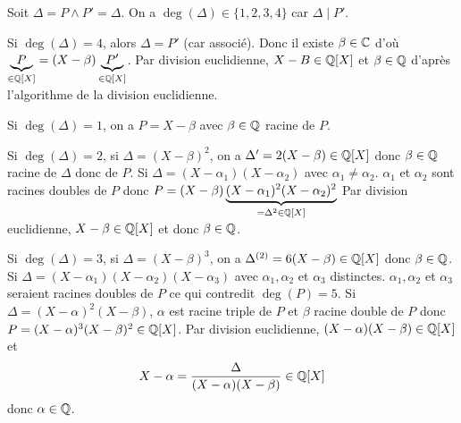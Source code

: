 \begin{solution}
	Soit $\Delta=P\wedge P'=\Delta$. On a $\deg(\Delta)\in\{1,2,3,4\}$ car $\Delta\mid P'$.

	Si $\deg(\Delta)=4$, alors $\Delta=P'$ (car associé). Donc il existe $\beta\in\mathbb{C}$ d'où $\underbrace{P}_{\in\mathbb{Q}[X]}=(X-\beta)\underbrace{P'}_{\in\mathbb{Q}[X]}$. Par division euclidienne, $X-B\in\mathbb{Q}[X]$ et $\beta\in\mathbb{Q}$ d'après l'algorithme de la division euclidienne.

	Si $\deg(\Delta)=1$, on a $P=X-\beta$ avec $\beta\in\mathbb{Q}$ racine de $P$.

	Si $\deg(\Delta)=2$, si $\Delta=(X-\beta)^{2}$, on a $\Delta'=2(X-\beta)\in\mathbb{Q}[X]$ donc $\beta\in\mathbb{Q}$ racine de $\Delta$ donc de $P$.
	Si $\Delta=(X-\alpha_{1})(X-\alpha_{2})$ avec $\alpha_{1}\neq\alpha_{2}$. $\alpha_{1}$ et $\alpha_{2}$ sont racines doubles de $P$ donc $P=(X-\beta)\underbrace{(X-\alpha_{1})^{2}(X-\alpha_{2})^{2}}_{=\Delta^{2}\in\mathbb{Q}[X]}$
	Par division euclidienne, $X-\beta\in\mathbb{Q}[X]$ et donc $\beta\in\mathbb{Q}$.

	Si $\deg(\Delta)=3$, si $\Delta=(X-\beta)^{3}$, on a $\Delta^{(2)}=6(X-\beta)\in\mathbb{Q}[X]$ donc $\beta\in\mathbb{Q}$.
	Si $\Delta=(X-\alpha_{1})(X-\alpha_{2})(X-\alpha_{3})$ avec $\alpha_{1},\alpha_{2}$ et $\alpha_{3}$ distinctes. $\alpha_{1},\alpha_{2}$ et $\alpha_{3}$ seraient racines doubles de $P$ ce qui contredit $\deg(P)=5$.
	Si $\Delta=(X-\alpha)^{2}(X-\beta)$, $\alpha$ est racine triple de $P$ et $\beta$ racine double de $P$ donc $P=(X-\alpha)^{3}(X-\beta)^{2}\in\mathbb{Q}[X]$. Par division euclidienne, $(X-\alpha)(X-\beta)\in\mathbb{Q}[X]$ et 
	$$X-\alpha=\frac{\Delta}{(X-\alpha)(X-\beta)}\in\mathbb{Q}[X]$$
	donc $\alpha\in\mathbb{Q}$.
\end{solution}

